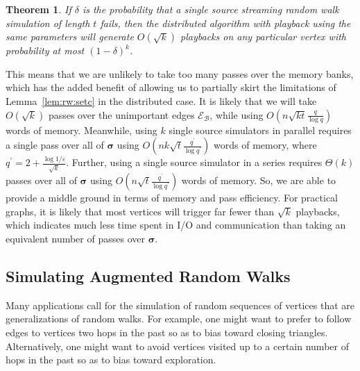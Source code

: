 \documentclass{report}
\newtheorem{theorem}{Theorem}[section]
\begin{document}
\begin{theorem} \label{thm:playback:bound}
If $\delta$ is the probability that a single source streaming random walk simulation of length $t$ fails, then the distributed algorithm with playback  using the same parameters will generate $O(\sqrt{k})$ playbacks on any particular vertex with probability at most $(1 - \delta)^k$.
\end{theorem}

This means that we are unlikely to take too many passes over the memory banks, which has the added benefit of allowing us to partially skirt the limitations of Lemma~\ref{lem:rw:setc} in the distributed case.
It is likely that we will take $O(\sqrt{k})$ passes over the unimportant edges $\mathcal{E}_\mathcal{B}$, while using $O \left (n\sqrt{kt}\frac{q}{\log q} \right )$ words of memory.
Meanwhile, using $k$ single source simulators in parallel requires a single pass over all of $\boldsymbol{\sigma}$ using $O\left (nk\sqrt{t}\frac{q^\prime}{\log q^\prime} \right )$ words of memory, where $q^\prime = 2 + \frac{\log 1/\varepsilon}{\sqrt{k}}$.
Further, using a single source simulator in a series requires $\Theta(k)$ passes over all of $\boldsymbol{\sigma}$ using $O\left (n\sqrt{t}\frac{q^\prime}{\log q^\prime} \right )$ words of memory.
So, we are able to provide a middle ground in terms of memory and pass efficiency.
For practical graphs, it is likely that most vertices will trigger far fewer than $\sqrt{k}$ playbacks, which indicates much less time spent in I/O and communication than taking an equivalent number of passes over $\boldsymbol{\sigma}$.



\subsection{Simulating Augmented Random Walks}
 \label{walks:sec:walks:augmented}

Many applications call for the simulation of random sequences of vertices that are generalizations of random walks. 
For example, one might want to prefer to follow edges to vertices two hops in the past so as to bias toward closing triangles. 
Alternatively, one might want to avoid vertices visited up to a certain number of hops in the past so as to bias toward exploration. 

\end{document}
